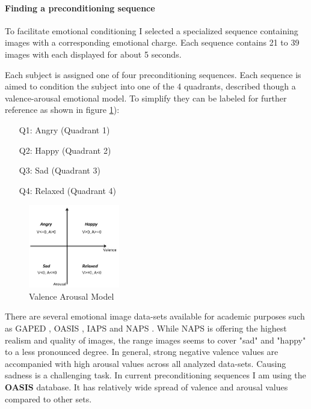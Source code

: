 \paragraph{Finding a preconditioning sequence}
To facilitate emotional conditioning I selected a specialized sequence containing images with a corresponding emotional charge.
Each sequence contains 21 to 39  images with each displayed for about 5 seconds.

Each subject is assigned one of four preconditioning sequences. Each sequence is aimed to condition the subject into one of the 4 quadrants, described though a valence-arousal emotional model. To simplify they can be labeled for further reference as shown in figure \ref{fig:valence_arousal_model}):
\begin{enumerate}
	\item[Q1:] Angry (Quadrant 1)
	\item[Q2:] Happy (Quadrant 2)
	\item[Q3:] Sad (Quadrant 3)
	\item[Q4:] Relaxed (Quadrant 4)
\end{enumerate}


\begin{figure}
\begin{center}
	\includegraphics[width=150px]{graphics/Valence-Arousal-model-showing-the-quadrants-of-the-four-emotion-tags-used-in-this_W640.jpg}
	\caption{Valence Arousal Model \cite{Song2013} \label{fig:valence_arousal_model}}
	
\end{center}
\end{figure}

There are several emotional image data-sets available for academic purposes such as GAPED \cite{Dan-Glauser2011}, OASIS \cite{Kurdi2017}, IAPS \cite{Lang1997} and NAPS \cite{Marchewka2014}. While NAPS is offering the highest realism and quality of images, the range images seems to cover "sad" and "happy" to a less pronounced degree. In general, strong negative valence values are accompanied with high arousal values across all analyzed data-sets. Causing sadness is a challenging task. In current preconditioning sequences I am using the \textbf{OASIS} database. It has relatively wide spread of valence and arousal values compared to other sets.

